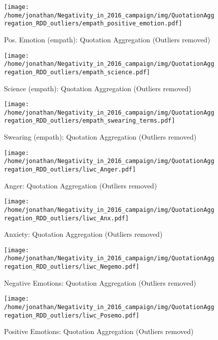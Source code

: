 \begin{figure}[h]\centering
	\texttt{[image: /home/jonathan/Negativity\_in\_2016\_campaign/img/QuotationAggregation\_RDD\_outliers/empath\_positive\_emotion.pdf]}
	\caption{Pos. Emotion (empath): Quotation Aggregation (Outliers removed)}
	\label{fig: qa_Pos. Emotion (empath)}
\end{figure}

\begin{figure}[h]\centering
	\texttt{[image: /home/jonathan/Negativity\_in\_2016\_campaign/img/QuotationAggregation\_RDD\_outliers/empath\_science.pdf]}
	\caption{Science (empath): Quotation Aggregation (Outliers removed)}
	\label{fig: qa_Science (empath)}
\end{figure}

\begin{figure}[h]\centering
	\texttt{[image: /home/jonathan/Negativity\_in\_2016\_campaign/img/QuotationAggregation\_RDD\_outliers/empath\_swearing\_terms.pdf]}
	\caption{Swearing (empath): Quotation Aggregation (Outliers removed)}
	\label{fig: qa_Swearing (empath)}
\end{figure}

\begin{figure}[h]\centering
	\texttt{[image: /home/jonathan/Negativity\_in\_2016\_campaign/img/QuotationAggregation\_RDD\_outliers/liwc\_Anger.pdf]}
	\caption{Anger: Quotation Aggregation (Outliers removed)}
	\label{fig: qa_Anger}
\end{figure}

\begin{figure}[h]\centering
	\texttt{[image: /home/jonathan/Negativity\_in\_2016\_campaign/img/QuotationAggregation\_RDD\_outliers/liwc\_Anx.pdf]}
	\caption{Anxiety: Quotation Aggregation (Outliers removed)}
	\label{fig: qa_Anxiety}
\end{figure}

\begin{figure}[h]\centering
	\texttt{[image: /home/jonathan/Negativity\_in\_2016\_campaign/img/QuotationAggregation\_RDD\_outliers/liwc\_Negemo.pdf]}
	\caption{Negative Emotions: Quotation Aggregation (Outliers removed)}
	\label{fig: qa_Negative Emotions}
\end{figure}

\begin{figure}[h]\centering
	\texttt{[image: /home/jonathan/Negativity\_in\_2016\_campaign/img/QuotationAggregation\_RDD\_outliers/liwc\_Posemo.pdf]}
	\caption{Positive Emotions: Quotation Aggregation (Outliers removed)}
	\label{fig: qa_Positive Emotions}
\end{figure}

